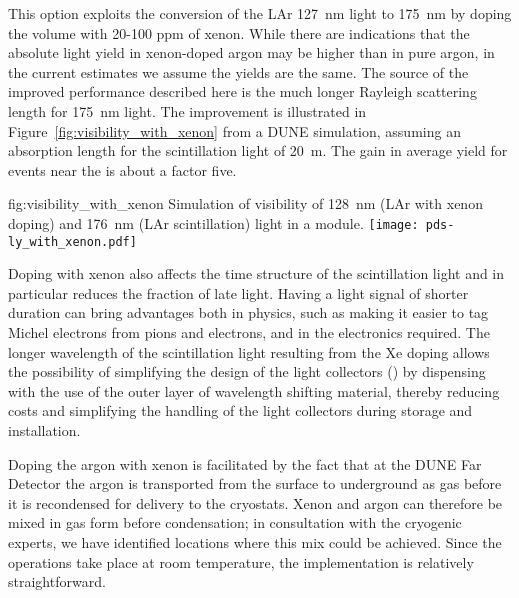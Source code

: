 This option exploits the conversion of the LAr \SI{127}{nm} light to \SI{175}{nm} by doping the \lar volume with 20-100 ppm of xenon.  While there are indications that the absolute light yield in xenon-doped argon may be higher than in pure argon, in the current estimates we assume the yields are the same. The source of the improved performance described here is the much longer Rayleigh scattering length for \SI{175}{nm} light.  The improvement is illustrated in Figure~\ref{fig:visibility_with_xenon} from a DUNE  simulation, assuming an absorption length for the scintillation light of \SI{20}{m}. The gain in average yield for events near the  is about a factor five.

\begin{dunefigure}
{fig:visibility_with_xenon}
{Simulation of visibility of \SI{128}{nm} (LAr with xenon doping) and \SI{176}{nm} (LAr scintillation) light in a  module.}
\texttt{[image: pds-ly\_with\_xenon.pdf]}
\end{dunefigure}

Doping with xenon also affects the time structure of the scintillation light and in particular reduces the fraction of late light.  Having a light signal of shorter duration can bring advantages both in physics, such as making it easier to tag Michel electrons from pions and electrons, and in the electronics required. The longer wavelength of the scintillation light resulting from the Xe doping allows the possibility of simplifying the design of the  light collectors () by dispensing with the use of the outer layer of wavelength shifting material, thereby reducing costs and simplifying the handling of the light collectors during storage and installation. 


Doping the argon with xenon is facilitated by the fact that at the DUNE Far Detector the argon is transported from the surface to underground as gas before it is recondensed for delivery to the cryostats. Xenon and argon can therefore be mixed in gas form before condensation;  in consultation with the cryogenic experts, we have identified locations where this mix could be achieved. Since the operations take place at room temperature, the implementation is relatively straightforward.

